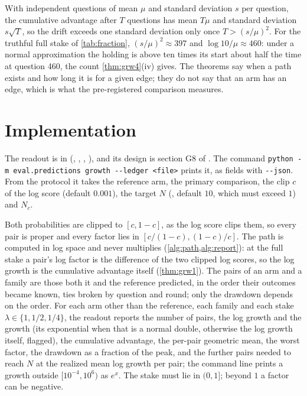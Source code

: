\documentclass[11pt]{article}
\theoremstyle{plain}
\theoremstyle{definition}
\theoremstyle{remark}
\begin{document}
With independent questions of mean $\mu$ and standard deviation $s$ per question, the cumulative
advantage after $T$ questions has mean $T\mu$ and standard deviation $s\sqrt T$, so the drift
exceeds one standard deviation only once $T>(s/\mu)^2$. For the truthful full stake of
\cref{tab:fraction}, $(s/\mu)^2\approx397$ and $\log10/\mu\approx460$: under a normal approximation
the holding is above ten times its start about half the time at question 460, the count
\cref{thm:grw4}(iv) gives. The theorems say when a path exists and how long it is for a given edge;
they do not say that an arm has an edge, which is what the pre-registered comparison measures.

\section{Implementation}
\label{sec:implementation}

The readout is in  (, ,
, ), and its design is section G8 of
. The command
\texttt{python -m eval.predictions growth -{}-ledger <file>} prints it, as fields with
\texttt{-{}-json}. From the protocol it takes the reference arm, the primary comparison, the clip
$c$ of the log score (default $0.001$), the target $N$ (, default $10$, which
must exceed $1$) and $N_c$.

Both probabilities are clipped to $[c,1-c]$, as the log score clips them, so every pair is proper
and every factor lies in $[c/(1-c),(1-c)/c]$. The path is computed in log space and never
multiplies (\cref{alg:path,alg:report}): at the full stake a pair's log factor is the difference of
the two clipped log scores, so the log growth is the cumulative advantage itself
(\cref{thm:grw1}). The pairs of an arm and a family are those both it and the reference predicted,
in the order their outcomes became known, ties broken by question and round; only the drawdown
depends on the order. For each arm other than the reference, each family and each stake
$\lambda\in\{1,1/2,1/4\}$, the readout reports the number of pairs, the log growth and the growth
(its exponential when that is a normal double, otherwise the log growth itself, flagged), the
cumulative advantage, the per-pair geometric mean, the worst factor, the drawdown as a fraction of
the peak, and the further pairs needed to reach $N$ at the realized mean log growth per pair; the
command line prints a growth outside $[10^{-4},10^{6})$ as $e^x$. The stake must lie in $(0,1]$;
beyond $1$ a factor can be negative.
\end{document}
